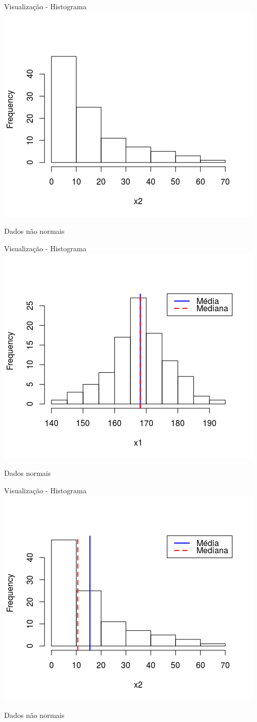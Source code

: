 \documentclass{beamer}
\begin{document}
\begin{frame}{Visualização - Histograma}
  \centering
  \includegraphics[width=.7\textwidth]{Cap37-38/lognormal1-h}

  Dados não normais
\end{frame}

\begin{frame}{Visualização - Histograma}
  \centering
  \includegraphics[width=.7\textwidth]{Cap37-38/normal2-h}

  Dados normais
\end{frame}

\begin{frame}{Visualização - Histograma}
  \centering
  \includegraphics[width=.7\textwidth]{Cap37-38/lognormal2-h}

  Dados não normais
\end{frame}
\end{document}
